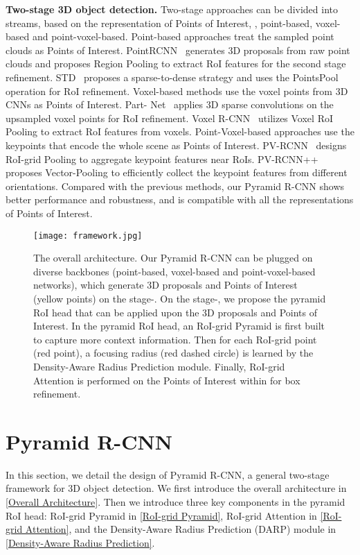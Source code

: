 \documentclass[10pt,twocolumn,letterpaper]{article}
\begin{document}
\noindent\textbf{Two-stage 3D object detection.} Two-stage approaches can be divided into  streams, based on the representation of Points of Interest, \ie, point-based, voxel-based and point-voxel-based. Point-based approaches treat the sampled point clouds as Points of Interest. PointRCNN~\cite{shi2019pointrcnn} generates 3D proposals from raw point clouds and proposes Region Pooling to extract RoI features for the second stage refinement. STD~\cite{yang2019std} proposes a sparse-to-dense strategy and uses the PointsPool operation for RoI refinement. Voxel-based methods use the voxel points from 3D CNNs as Points of Interest. Part- Net~\cite{shi2020points} applies 3D sparse convolutions on the upsampled voxel points for RoI refinement. Voxel R-CNN~\cite{deng2020voxel} utilizes Voxel RoI Pooling to extract RoI features from voxels. Point-Voxel-based approaches use the keypoints that encode the whole scene as Points of Interest. PV-RCNN~\cite{shi2020pv} designs RoI-grid Pooling to aggregate keypoint features near RoIs. PV-RCNN++~\cite{shi2021pv} proposes Vector-Pooling to efficiently collect the keypoint features from different orientations. Compared with the previous methods, our Pyramid R-CNN shows better performance and robustness, and is compatible with all the representations of Points of Interest.

\begin{figure*}[!t]
\vspace{-6mm}
\centering
\texttt{[image: framework.jpg]}
\vspace{-5mm}
\caption{The overall architecture. Our Pyramid R-CNN can be plugged on diverse backbones (\eg point-based, voxel-based and point-voxel-based networks), which generate 3D proposals and Points of Interest (yellow points) on the stage-. On the stage-, we propose the pyramid RoI head that can be applied upon the 3D proposals and Points of Interest. In the pyramid RoI head, an RoI-grid Pyramid is first built to capture more context information. Then for each RoI-grid point (red point), a focusing radius  (red dashed circle) is learned by the Density-Aware Radius Prediction module. Finally, RoI-grid Attention is performed on the Points of Interest within  for box refinement.}
\label{fig_framework}
\vspace{-2mm}
\end{figure*}

\section{Pyramid R-CNN}
In this section, we detail the design of Pyramid R-CNN, a general two-stage framework for 3D object detection. We first introduce the overall architecture in \ref{Overall Architecture}. Then we introduce three key components in the pyramid RoI head: RoI-grid Pyramid in \ref{RoI-grid Pyramid}, RoI-grid Attention in \ref{RoI-grid Attention}, and the Density-Aware Radius Prediction (DARP) module in \ref{Density-Aware Radius Prediction}.
\end{document}
